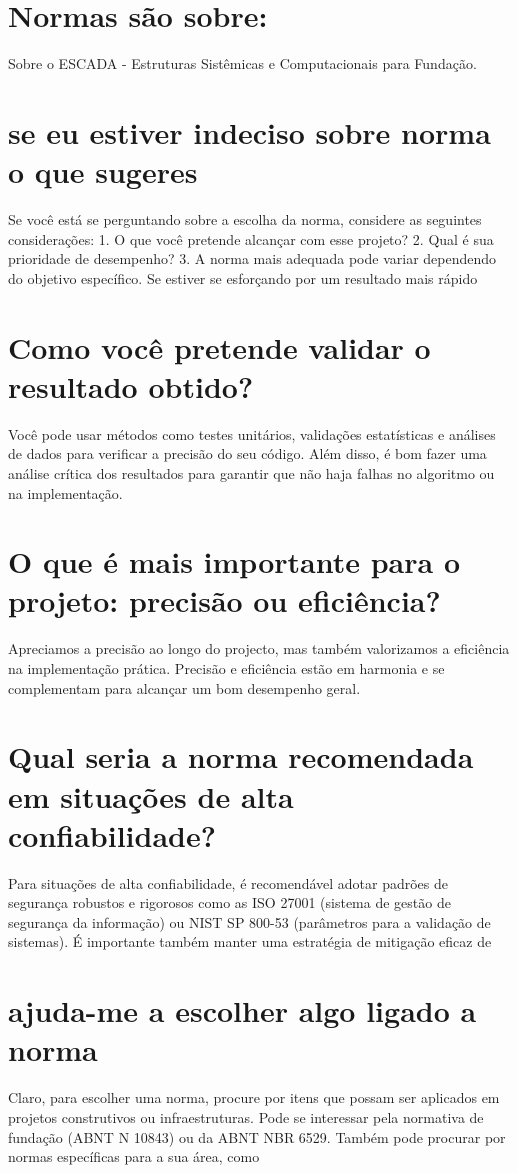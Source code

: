 \documentclass[11pt,a4paper]{article}
\begin{document}
\section{Normas são sobre:}
Sobre o ESCADA - Estruturas Sistêmicas e Computacionais para Fundação.

\section{se eu estiver indeciso sobre norma o que sugeres}
Se você está se perguntando sobre a escolha da norma, considere as seguintes considerações: 1. O que você pretende alcançar com esse projeto? 2. Qual é sua prioridade de desempenho? 3. A norma mais adequada pode variar dependendo do objetivo específico. Se estiver se esforçando por um resultado mais rápido

\section{Como você pretende validar o resultado obtido?}
Você pode usar métodos como testes unitários, validações estatísticas e análises de dados para verificar a precisão do seu código. Além disso, é bom fazer uma análise crítica dos resultados para garantir que não haja falhas no algoritmo ou na implementação.

\section{O que é mais importante para o projeto: precisão ou eficiência?}
Apreciamos a precisão ao longo do projecto, mas também valorizamos a eficiência na implementação prática. Precisão e eficiência estão em harmonia e se complementam para alcançar um bom desempenho geral.

\section{Qual seria a norma recomendada em situações de alta confiabilidade?}
Para situações de alta confiabilidade, é recomendável adotar padrões de segurança robustos e rigorosos como as ISO 27001 (sistema de gestão de segurança da informação) ou NIST SP 800-53 (parâmetros para a validação de sistemas). É importante também manter uma estratégia de mitigação eficaz de

\section{ajuda-me a escolher algo ligado a norma}
Claro, para escolher uma norma, procure por itens que possam ser aplicados em projetos construtivos ou infraestruturas. Pode se interessar pela normativa de fundação (ABNT N 10843) ou da ABNT NBR 6529. Também pode procurar por normas específicas para a sua área, como
\end{document}

